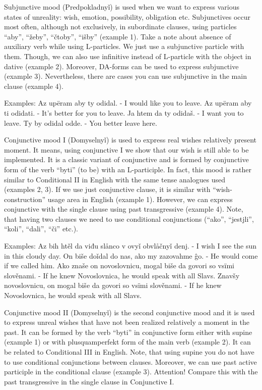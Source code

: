 Subjunctive mood (Predpokladnyǐ) is used when we want to express various states of unreality: wish, emotion, possibility, obligation etc. Subjunctives occur most often, although not exclusively, in subordinate clauses, using particles “aby”, “žeby”, “čtoby”, “išby” (example 1).
Take a note about absence of auxiliary verb while using L-particles. We just use a subjunctive particle with them. Though, we can also use infinitive instead of L-particle with the object in dative (example 2). Moreover, DA-forms can be used to express subjunctive (example 3). Nevertheless, there are cases you can use subjunctive in the main clause (example 4). 

Examples:
Az upëram aby ty odidal. - I would like you to leave.
Az upëram aby ti odidati. - It’s better for you to leave.
Ja htem da ty odidaš. - I want you to leave.
Ty by odidal odde. - You better leave here.

Conjunctive mood I (Domyselnyǐ) is used to express real wishes relatively present moment. It means, using conjunctive I we show that our wish is still able to be implemented. It is a classic variant of conjunctive and is formed by conjunctive form of the verb “byti” (to be) with an L-participle.
In fact, this mood is rather similar to Conditional II in English with the same tense analogues used (examples 2, 3). If we use just conjunctive clause, it is similar with “wish-construction” usage area in English (example 1). However, we can express conjunctive with the single clause using past transgressive (example 4).
Note, that having two clauses we need to use conditional conjunctions (“ako”, “jestjli”, “koli”, “dali”, “či” etc.).

Examples:
Az bih htěl da viđu slånco v ovyǐ obvlåčnyǐ denj. - I wish I see the sun in this cloudy day.
On biše doǐdal do nas, ako my zazovahme ĝo. - He would come if we called him.
Ako znaše on novoslovnicu, mogal biše da govori so vsïmi slověnami. - If he knew Novoslovnica, he would speak with all Slavs.
Znavšy novoslovnicu, on mogal biše da govori so vsïmi slověnami. - If he knew Novoslovnica, he would speak with all Slavs.

Conjunctive mood II (Domyselnyǐ) is the second conjunctive mood and it is used to express unreal wishes that have not been realized relatively a moment in the past. It can be formed by the verb “byti” in conjunctive form either  with supine (example 1) or with plusquamperfekt form of the main verb (example 2). It can be related to Conditional III in English. 
Note, that using supine you do not have to use conditional conjunctions between clauses. Moreover, we can use past active participle in the conditional clause (example 3). Attention! Compare this with the past transgressive in the single clause in Conjunctive I.

